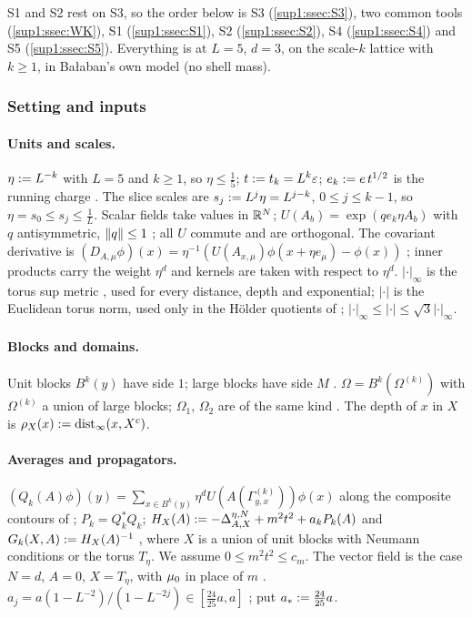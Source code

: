 S1 and S2 rest on S3, so the order below is S3 (\cref{sup1:ssec:S3}), two common tools (\cref{sup1:ssec:WK}), S1 (\cref{sup1:ssec:S1}), S2 (\cref{sup1:ssec:S2}), S4 (\cref{sup1:ssec:S4}) and S5 (\cref{sup1:ssec:S5}). Everything is at $L=5$, $d=3$, on the scale-$k$ lattice with $k\ge1$, in Ba{\l}aban's own model (no shell mass).

\subsubsection{Setting and inputs}\label{sup1:ssec:setting}

\paragraph{Units and scales.} $\eta:= L^{-k}$ with $L=5$ and $k\ge1$, so $\eta\le\frac15$; $t:= t_k=L^k\varepsilon$; $e_k:= e\,t^{1/2}$ is the running charge \cite[(2.23)]{Ba1}. The slice scales are $s_j:= L^j\eta=L^{j-k}$, $0\le j\le k-1$, so $\eta=s_0\le s_j\le\frac1L$. Scalar fields take values in $\mathbb R^N$; $U(A_b)=\exp(qe_k\eta A_b)$ with $q$ antisymmetric, $\lVert q\rVert\le1$ \cite[p.~605]{Ba1}; all $U$ commute and are orthogonal. The covariant derivative is $(D_{A,\mu}\phi)(x)=\eta^{-1}(U(A_{x,\mu})\phi(x+\eta e_\mu)-\phi(x))$ \cite[(1.7)]{Ba1}; inner products carry the weight $\eta^d$ and kernels are taken with respect to $\eta^d$. $|\cdot|_\infty$ is the torus sup metric \cite[(1.3)]{Ba1}, used for every distance, depth and exponential; $|\cdot|$ is the Euclidean torus norm, used only in the H\"older quotients of \cite[(1.32)]{Ba3}; $|\cdot|_\infty\le|\cdot|\le\sqrt3|\cdot|_\infty$.

\paragraph{Blocks and domains.} Unit blocks $B^k(y)$ have side $1$; large blocks have side $M$ \cite[p.~607]{Ba1}. $\Omega=B^k(\Omega^{(k)})$ with $\Omega^{(k)}$ a union of large blocks; $\Omega_1$, $\Omega_2$ are of the same kind \cite[p.~414]{Ba3}. The depth of $x$ in $X$ is $\rho_X(x):=\operatorname{dist}_\infty(x,X^c)$.

\paragraph{Averages and propagators.} $(Q_k(A)\phi)(y)=\sum_{x\in B^k(y)}\eta^dU(A(\Gamma^{(k)}_{y,x}))\phi(x)$ along the composite contours of \cite[(2.1)--(2.2)]{Ba1}; $P_k=Q_k^*Q_k$; $H_X(A):=-\Delta^{\eta,N}_{A,X}+m^2t^2+a_kP_k(A)$ and $G_k(X,A):= H_X(A)^{-1}$ \cite[(2.22)]{Ba1}, where $X$ is a union of unit blocks with Neumann conditions or the torus $T_\eta$. We assume $0\le m^2t^2\le c_m$. The vector field is the case $N=d$, $A=0$, $X=T_\eta$, with $\mu_0$ in place of $m$ \cite[p.~608]{Ba1}. $a_j=a(1-L^{-2})/(1-L^{-2j})\in[\frac{24}{25}a,a]$ \cite[(2.15)]{Ba1}; put $a_*:=\frac{24}{25}a$.

